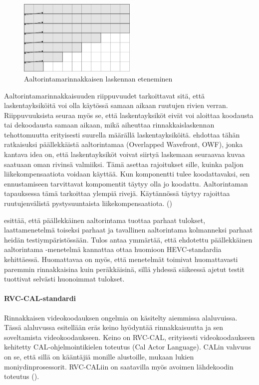 \begin{figure}[ht]
	\centering
	\includegraphics[width=0.5\textwidth]{WPP.jpg}
	\caption{Aaltorintamarinnakkaisen laskennan eteneminen}
	\label{fig:wpp}
\end{figure}

Aaltorintamarinnakkaisuuden riippuvuudet tarkoittavat sitä, että
laskentayksiköitä voi olla käytössä samaan aikaan ruutujen rivien verran.
Riippuvuuksista seuraa myös se, että laskentayksiköt eivät voi aloittaa
koodausta tai dekoodausta samaan aikaan, mikä aiheuttaa rinnakkaislaskennan
tehottomuutta erityisesti suurella määrällä laskentayksiköitä.
\citealt{chi} ehdottaa tähän ratkaisuksi päällekkäistä
aaltorintamaa (Overlapped Wavefront, OWF), jonka kantava idea on, että
laskentayksiköt voivat siirtyä laskemaan seuraavaa kuvaa saatuaan oman rivinsä
valmiiksi. Tämä asettaa rajoitukset sille, kuinka paljon liikekompensaatiota
voidaan käyttää. Kun komponentti tulee koodattavaksi, sen ennustamiseen
tarvittavat kompomentit täytyy olla jo koodattu. Aaltorintaman tapauksessa
tämä tarkoittaa ylempiä rivejä. Käytännössä täytyy rajoittaa ruutujenvälistä
pystysuuntaista liikekompensaatiota. (\citealt{chi})

\citealt{chi} esittää, että päällekkäinen aaltorintama tuottaa parhaat tulokset,
laattamenetelmä toiseksi parhaat ja tavallinen aaltorintama kolmanneksi parhaat
heidän testiympäristössään. Tulos antaa ymmärtää, että ehdotettu päällekkäinen
aaltorintama -menetelmä kannattaa ottaa huomioon HEVC-standardia kehittäessä.
Huomattavaa on myös, että menetelmät toimivat huomattavasti paremmin
rinnakkaisina kuin peräkkäisinä, sillä yhdessä säikeessä ajetut testit
tuottivat selvästi huonoimmat tulokset.

\paragraph{RVC-CAL-standardi}

Rinnakkaisen videokoodauksen ongelmia on käsitelty aiemmissa alaluvuissa. Tässä
alaluvussa esitellään eräs keino hyödyntää rinnakkaisuutta ja sen soveltamista
videokoodaukseen. Keino on RVC-CAL, erityisesti videokoodaukseen kehitetty
CAL-ohjelmointikielen toteutus (Cal Actor Language). CALin vahvuus on se, että
sillä on kääntäjiä monille alustoille, mukaan lukien moniydinprosessorit.
RVC-CALiin on saatavilla myös avoimen lähdekoodin toteutus (\citealt{orcc}).

